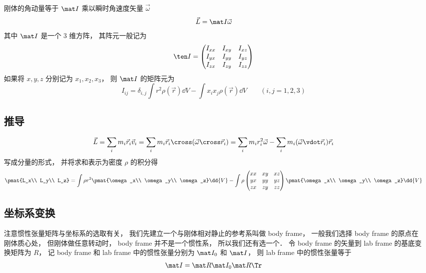 
刚体的角动量等于 $\mat I$ 乘以瞬时角速度矢量 $\vec \omega$
\begin{equation}
\vec L = \mat I \vec \omega
\end{equation}
其中 $\mat I$ 是一个 3 维方阵， 其阵元一般记为
\begin{equation}
\ten I = \begin{pmatrix}
I_{xx}& I_{xy}& I_{xz} \\
I_{yx}& I_{yy}& I_{yz} \\
I_{zx}& I_{zy}& I_{zz}
\end{pmatrix}
\end{equation}
如果将 $x, y, z$ 分别记为 $x_1, x_2, x_3$， 则 $\mat I$ 的矩阵元为
\begin{equation}
I_{ij} = \delta_{i, j} \int r^2 \rho(\vec r)\dd{V} - \int x_i x_j \rho(\vec r)\dd{V} \qquad (i, j = 1, 2, 3)
\end{equation}

\subsection{推导}
\begin{equation}
\vec L = \sum_i m_i \vec r_i \vec v_i = \sum_i m_i \vec r_i \cross (\vec \omega \cross \vec r_i) = \sum_i m_i r_i^2 \vec \omega - \sum_i m_i (\vec \omega \vdot \vec r_i) \vec r_i
\end{equation}
写成分量的形式， 并将求和表示为密度 $\rho$ 的积分得
\begin{equation}
\pmat{L_x\\ L_y\\ L_z} = \int \rho r^2 \pmat{\omega_x\\ \omega_y\\ \omega_z} \dd{V} - \int \rho
\begin{pmatrix}
xx & xy & xz\\
yx & yy & yz\\
zx & zy & zz
\end{pmatrix}
\pmat{\omega_x\\ \omega_y\\ \omega_z} \dd{V}
\end{equation}

\subsection{坐标系变换}
注意惯性张量矩阵与坐标系的选取有关， 我们先建立一个与刚体相对静止的参考系叫做 body frame，%
一般我们选择 body frame 的原点在刚体质心处， 但刚体做任意转动时， body frame 并不是一个惯性系， 所以我们还有选一个． 令 body frame 的矢量到 lab frame 的基底变换矩阵为 $R$， 记 body frame 和 lab frame 中的惯性张量分别为 $\mat I_0$ 和 $\mat I$， 则 lab frame 中的惯性张量等于
\begin{equation}
\mat I = \mat R \mat I_0 \mat R\Tr
\end{equation}

